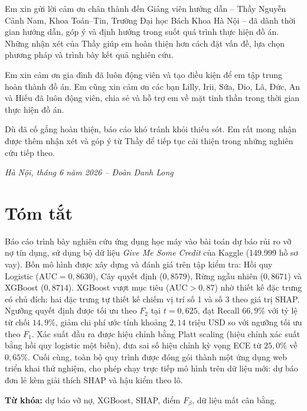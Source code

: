\documentclass[12pt,a4paper,oneside]{report}
\theoremstyle{vnplain}
\theoremstyle{vndef}
\begin{document}
Em xin gửi lời cảm ơn chân thành đến Giảng viên hướng dẫn -- Thầy Nguyễn Cảnh Nam, Khoa
Toán--Tin, Trường Đại học Bách Khoa Hà Nội -- đã dành thời gian hướng dẫn, góp ý và định
hướng trong suốt quá trình thực hiện đồ án. Những nhận xét của Thầy giúp em hoàn thiện
hơn cách đặt vấn đề, lựa chọn phương pháp và trình bày kết quả nghiên cứu.

Em xin cảm ơn gia đình đã luôn động viên và tạo điều kiện để em tập trung hoàn thành đồ
án. Em cũng xin cảm ơn các bạn Lilly, Irii, Sứa, Dio, Lã, Đức, An và Hiếu đã luôn động
viên, chia sẻ và hỗ trợ em về mặt tinh thần trong thời gian thực hiện đồ án.

Dù đã cố gắng hoàn thiện, báo cáo khó tránh khỏi thiếu sót. Em rất mong nhận được thêm
nhận xét và góp ý từ Thầy để tiếp tục cải thiện trong những nghiên cứu tiếp theo.

\vspace{8pt}
\hfill\emph{Hà Nội, tháng 6 năm 2026 -- Đoàn Danh Long}

\chapter*{Tóm tắt}

Báo cáo trình bày nghiên cứu ứng dụng học máy vào bài toán dự báo rủi ro vỡ nợ tín dụng,
sử dụng bộ dữ liệu \emph{Give Me Some Credit} của Kaggle (149.999 hồ sơ vay). Bốn mô hình
được xây dựng và đánh giá trên tập kiểm tra: Hồi quy Logistic ($\mathrm{AUC}=0{,}8630$),
Cây quyết định ($0{,}8579$), Rừng ngẫu nhiên ($0{,}8671$) và XGBoost ($0{,}8714$). XGBoost
vượt mục tiêu ($\mathrm{AUC}>0{,}87$) nhờ thiết kế đặc trưng có chủ đích: hai đặc trưng tự
thiết kế chiếm vị trí số 1 và số 3 theo giá trị SHAP\@. Ngưỡng quyết định được tối ưu theo
$F_2$ tại $t=0{,}625$, đạt Recall $66{,}9\%$ với tỷ lệ từ chối $14{,}9\%$, giảm chi phí
ước tính khoảng $2{,}14$ triệu USD so với ngưỡng tối ưu theo $F_1$. Xác suất đầu ra được
hiệu chỉnh bằng Platt scaling (hiệu chỉnh xác suất bằng hồi quy logistic một biến), đưa
sai số hiệu chỉnh kỳ vọng ECE từ $25{,}0\%$ về $0{,}65\%$. Cuối cùng, toàn bộ quy trình được đóng gói thành một ứng
dụng web triển khai thử nghiệm, cho phép chạy trực tiếp mô hình trên dữ liệu mới: dự báo
đơn lẻ kèm giải thích SHAP và hậu kiểm theo lô.

\vspace{6pt}
\noindent\textbf{Từ khóa:} dự báo vỡ nợ, XGBoost, SHAP, điểm $F_\beta$, dữ liệu mất cân bằng.
\end{document}
